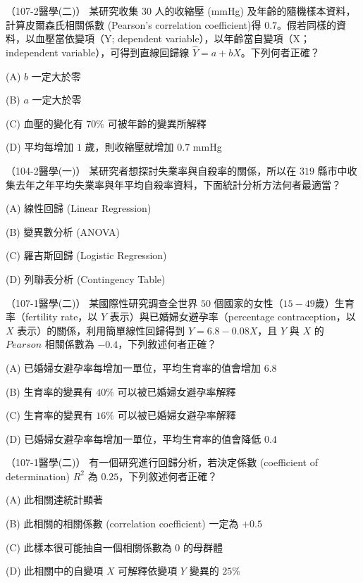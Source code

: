     \begin{docexam}{（107-2醫學(二)）}
        某研究收集 $30$ 人的收縮壓 (mmHg) 及年齡的隨機樣本資料，計算皮爾森氏相關係數 (Pearson's correlation coefficient)得 $0.7$。假若同樣的資料，以血壓當依變項（Y; dependent variable），以年齡當自變項（X；independent variable），可得到直線回歸線 $\hat{Y} = a + b X$。下列何者正確？

        (A) $b$ 一定大於零
        
        (B) $a$ 一定大於零

        (C) 血壓的變化有 $70\%$ 可被年齡的變異所解釋
 
        (D) 平均每增加 $1$ 歲，則收縮壓就增加 $0.7$ mmHg
    \end{docexam}
    
    \begin{docexam}{（104-2醫學(一)）}
        某研究者想探討失業率與自殺率的關係，所以在 $319$ 縣市中收集去年之年平均失業率與年平均自殺率資料，下面統計分析方法何者最適當？

        (A) 線性回歸 (Linear Regression)
        
        (B) 變異數分析 (ANOVA)

        (C) 羅吉斯回歸 (Logistic Regression)
 
        (D) 列聯表分析 (Contingency Table)
    \end{docexam}
    
    \begin{docexam}{（107-1醫學(二)）}
        某國際性研究調查全世界 $50$ 個國家的女性（$15-49$歲）生育率（fertility rate，以 $Y$ 表示）與已婚婦女避孕率（percentage contraception，以 $X$ 表示）的關係，利用簡單線性回歸得到 $Y = 6.8-0.08 X$，且 $Y$ 與 $X$ 的 $Pearson$ 相關係數為 $-0.4$，下列敘述何者正確？

        (A) 已婚婦女避孕率每增加一單位，平均生育率的值會增加 $6.8$
        
        (B) 生育率的變異有 $40\%$ 可以被已婚婦女避孕率解釋

        (C) 生育率的變異有 $16\%$ 可以被已婚婦女避孕率解釋
 
        (D) 已婚婦女避孕率每增加一單位，平均生育率的值會降低 $0.4$
    \end{docexam}
    
    \begin{docexam}{（107-1醫學(二)）}
        有一個研究進行回歸分析，若決定係數 (coefficient of determination) $R^2$ 為 $0.25$，下列敘述何者正確？

        (A) 此相關達統計顯著
        
        (B) 此相關的相關係數 (correlation coefficient) 一定為 $+0.5$

        (C) 此樣本很可能抽自一個相關係數為 $0$ 的母群體
 
        (D) 此相關中的自變項 $X$ 可解釋依變項 $Y$ 變異的 $25\%$
    \end{docexam}
    

